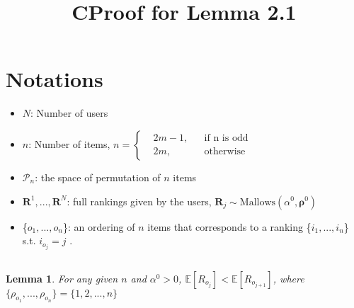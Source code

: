 \documentclass[11pt, oneside]{article}   	%
\title{CProof for Lemma 2.1}
\author{}
\date{}							%
\newtheorem{lemma}[theorem]{Lemma}
\begin{document}
\maketitle
\section{Notations}
\begin{itemize}
	\item {$N$: Number of users}
	
	\item {$n$: Number of items,    $
		n = \left \{
		\begin{aligned}
		&2m-1, && \text{if n is odd} \\
		&2m, && \text{otherwise}
		\end{aligned} \right.
		$}
	
	\item{$\mathcal{P}_n$: the space of permutation of $n$ items}
	\item {$\bm{R}^1,...,\bm{R}^N$: full rankings given by the users, $\bm{R}_j \sim \text{Mallows}(\alpha^0, \bm{\rho}^0)$}
	
	\item{ \{$o_1, ..., o_n$\}: an ordering of $n$ items that corresponds to a ranking \{$i_1, ..., i_n$\} s.t. $i_{o_j} = j$ }.
\end{itemize}

\subsection{}
\begin{lemma} 
	For any given $n$ and $\alpha^0>0$, $\mathbb{E}[{R}_{o_j}]<\mathbb{E}[{R}_{o_{j+1}}]$, where $\{\rho_{o_1}, ..., \rho_{o_n}\} = \{1, 2, ..., n\}$
	
\end{lemma}
\end{document}
